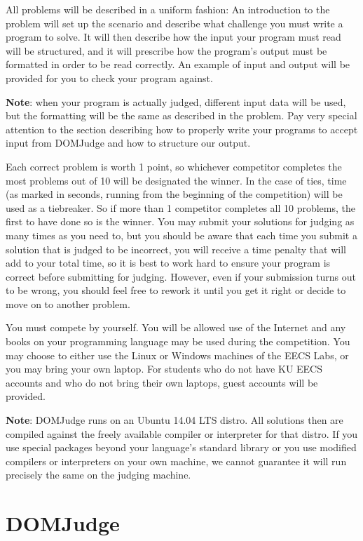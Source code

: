 \documentclass[a4paper]{article}
\begin{document}
All problems will be described in a uniform fashion: An introduction to the problem will set up the scenario and describe what challenge you must write a program to solve. It will then describe how the input your program must read will be structured, and it will prescribe how the program's output must be formatted in order to be read correctly. An example of input and output will be provided for you to check your program against. 

\textbf{Note}: when your program is actually judged, different input data will be used, but the formatting will be the same as described in the problem. Pay very special attention to the section describing how to properly write your programs to accept input from DOMJudge and how to structure our output.

Each correct problem is worth 1 point, so whichever competitor completes the most problems out of 10 will be designated the winner. In the case of ties, time (as marked in seconds, running from the beginning of the competition) will be used as a tiebreaker. So if more than 1 competitor completes all 10 problems, the first to have done so is the winner. You may submit your solutions for judging as many times as you need to, but you should be aware that each time you submit a solution that is judged to be incorrect, you will receive a time penalty that will add to your total time, so it is best to work hard to ensure your program is correct before submitting for judging. However, even if your submission turns out to be wrong, you should feel free to rework it until you get it right or decide to move on to another problem. 

You must compete by yourself. You will be allowed use of the Internet and any books on your programming language may be used during the competition. You may choose to either use the Linux or Windows machines of the EECS Labs, or you may bring your own laptop. For students who do not have KU EECS accounts and who do not bring their own laptops, guest accounts will be provided. 

\textbf{Note}: DOMJudge runs on an Ubuntu 14.04 LTS distro. All solutions then are compiled against the freely available compiler or interpreter for that distro. If you use special packages beyond your language's standard library or you use modified compilers or interpreters on your own machine, we cannot guarantee it will run precisely the same on the judging machine.

\newpage

\section{DOMJudge}
\end{document}
